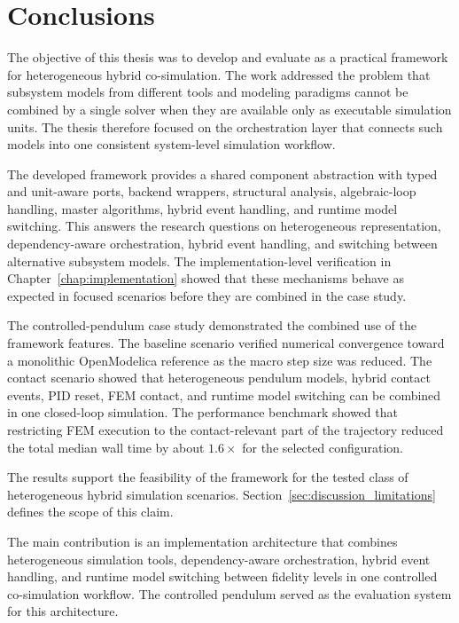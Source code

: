 \section{Conclusions}
\label{sec:discussion_conclusions}

The objective of this thesis was to develop and evaluate \syssimx{} as a practical framework for heterogeneous hybrid co-simulation.
The work addressed the problem that subsystem models from different tools and modeling paradigms cannot be combined by a single solver when they are available only as executable simulation units.
The thesis therefore focused on the orchestration layer that connects such models into one consistent system-level simulation workflow.

The developed framework provides a shared component abstraction with typed and unit-aware ports, backend wrappers, structural analysis, algebraic-loop handling, master algorithms, hybrid event handling, and runtime model switching.
This answers the research questions on heterogeneous representation, dependency-aware orchestration, hybrid event handling, and switching between alternative subsystem models.
The implementation-level verification in Chapter~\ref{chap:implementation} showed that these mechanisms behave as expected in focused scenarios before they are combined in the case study.

The controlled-pendulum case study demonstrated the combined use of the framework features.
The baseline scenario verified numerical convergence toward a monolithic OpenModelica reference as the macro step size was reduced.
The contact scenario showed that heterogeneous pendulum models, hybrid contact events, PID reset, FEM contact, and runtime model switching can be combined in one closed-loop simulation.
The performance benchmark showed that restricting \ac{FEM} execution to the contact-relevant part of the trajectory reduced the total median wall time by about \(1.6\times\) for the selected configuration.

The results support the feasibility of the framework for the tested class of heterogeneous hybrid simulation scenarios.
Section~\ref{sec:discussion_limitations} defines the scope of this claim.

The main contribution is an implementation architecture that combines heterogeneous simulation tools, dependency-aware orchestration, hybrid event handling, and runtime model switching between fidelity levels in one controlled co-simulation workflow.
The controlled pendulum served as the evaluation system for this architecture.